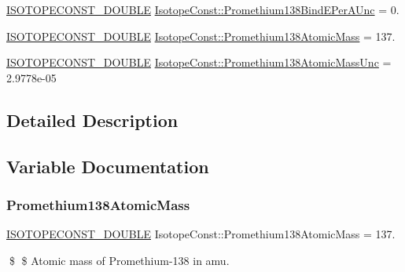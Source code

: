 \begin{DoxyCompactItemize}
\item 
\mbox{\hyperlink{group___isotope_const-_macros_ga8f45a7272ce02c0b4c65c44636ed719a}{I\+S\+O\+T\+O\+P\+E\+C\+O\+N\+S\+T\+\_\+\+D\+O\+U\+B\+LE}} \mbox{\hyperlink{group___isotope_const-_promethium-_pm138_ga45ba5de19e245af54895847bd034547b}{Isotope\+Const\+::\+Promethium138\+Bind\+E\+Per\+A\+Unc}} = 0.
\item 
\mbox{\hyperlink{group___isotope_const-_macros_ga8f45a7272ce02c0b4c65c44636ed719a}{I\+S\+O\+T\+O\+P\+E\+C\+O\+N\+S\+T\+\_\+\+D\+O\+U\+B\+LE}} \mbox{\hyperlink{group___isotope_const-_promethium-_pm138_gabc88f3b897edd71d559645d08870ab66}{Isotope\+Const\+::\+Promethium138\+Atomic\+Mass}} = 137.
\item 
\mbox{\hyperlink{group___isotope_const-_macros_ga8f45a7272ce02c0b4c65c44636ed719a}{I\+S\+O\+T\+O\+P\+E\+C\+O\+N\+S\+T\+\_\+\+D\+O\+U\+B\+LE}} \mbox{\hyperlink{group___isotope_const-_promethium-_pm138_ga2898ee3b2d5e64a34c05abe22f2986a3}{Isotope\+Const\+::\+Promethium138\+Atomic\+Mass\+Unc}} = 2.\+9778e-\/05
\end{DoxyCompactItemize}


\subsection{Detailed Description}


\subsection{Variable Documentation}
\mbox{\label{group___isotope_const-_promethium-_pm138_gabc88f3b897edd71d559645d08870ab66}} 
\subsubsection{\texorpdfstring{Promethium138\+Atomic\+Mass}{Promethium138AtomicMass}}
{\footnotesize\ttfamily \mbox{\hyperlink{group___isotope_const-_macros_ga8f45a7272ce02c0b4c65c44636ed719a}{I\+S\+O\+T\+O\+P\+E\+C\+O\+N\+S\+T\+\_\+\+D\+O\+U\+B\+LE}} Isotope\+Const\+::\+Promethium138\+Atomic\+Mass = 137.}

\$ \$ Atomic mass of Promethium-\/138 in amu. \mbox{\label{group___isotope_const-_promethium-_pm138_ga2898ee3b2d5e64a34c05abe22f2986a3}} 
